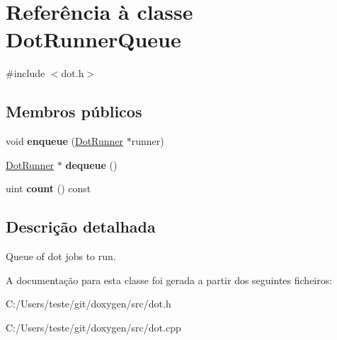 \hypertarget{class_dot_runner_queue}{\section{Referência à classe Dot\-Runner\-Queue}
\label{class_dot_runner_queue}
}


{\ttfamily \#include $<$dot.\-h$>$}

\subsection*{Membros públicos}
\begin{DoxyCompactItemize}
\item 
\hypertarget{class_dot_runner_queue_a88038caea674eb6d165edffaeed3db4f}{void {\bfseries enqueue} (\hyperlink{class_dot_runner}{Dot\-Runner} $\ast$runner)}\label{class_dot_runner_queue_a88038caea674eb6d165edffaeed3db4f}

\item 
\hypertarget{class_dot_runner_queue_a64eaeddb48ef9f4a9f7a469e2f3c5107}{\hyperlink{class_dot_runner}{Dot\-Runner} $\ast$ {\bfseries dequeue} ()}\label{class_dot_runner_queue_a64eaeddb48ef9f4a9f7a469e2f3c5107}

\item 
\hypertarget{class_dot_runner_queue_a774149fc271ebaba2aabcd183a836e8f}{uint {\bfseries count} () const }\label{class_dot_runner_queue_a774149fc271ebaba2aabcd183a836e8f}

\end{DoxyCompactItemize}


\subsection{Descrição detalhada}
Queue of dot jobs to run. 

A documentação para esta classe foi gerada a partir dos seguintes ficheiros\-:\begin{DoxyCompactItemize}
\item 
C\-:/\-Users/teste/git/doxygen/src/dot.\-h\item 
C\-:/\-Users/teste/git/doxygen/src/dot.\-cpp\end{DoxyCompactItemize}

